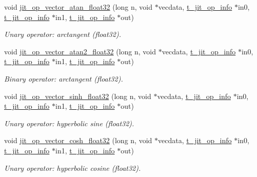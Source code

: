 \begin{DoxyCompactItemize}
void \hyperlink{group__opvecmod_gaeb40d9e60bc56e3cb0b2c8c595320d29}{jit\_\-op\_\-vector\_\-atan\_\-float32} (long n, void $\ast$vecdata, \hyperlink{structt__jit__op__info}{t\_\-jit\_\-op\_\-info} $\ast$in0, \hyperlink{structt__jit__op__info}{t\_\-jit\_\-op\_\-info} $\ast$in1, \hyperlink{structt__jit__op__info}{t\_\-jit\_\-op\_\-info} $\ast$out)
\begin{DoxyCompactList}\small\item\em Unary operator: arctangent (float32). \item\end{DoxyCompactList}\item 
void \hyperlink{group__opvecmod_ga2dfff20e34210f289f81daa3659e9e01}{jit\_\-op\_\-vector\_\-atan2\_\-float32} (long n, void $\ast$vecdata, \hyperlink{structt__jit__op__info}{t\_\-jit\_\-op\_\-info} $\ast$in0, \hyperlink{structt__jit__op__info}{t\_\-jit\_\-op\_\-info} $\ast$in1, \hyperlink{structt__jit__op__info}{t\_\-jit\_\-op\_\-info} $\ast$out)
\begin{DoxyCompactList}\small\item\em Binary operator: arctangent (float32). \item\end{DoxyCompactList}\item 
void \hyperlink{group__opvecmod_gae9e0f85188a1b8e4e6bb9bc717edf3cf}{jit\_\-op\_\-vector\_\-sinh\_\-float32} (long n, void $\ast$vecdata, \hyperlink{structt__jit__op__info}{t\_\-jit\_\-op\_\-info} $\ast$in0, \hyperlink{structt__jit__op__info}{t\_\-jit\_\-op\_\-info} $\ast$in1, \hyperlink{structt__jit__op__info}{t\_\-jit\_\-op\_\-info} $\ast$out)
\begin{DoxyCompactList}\small\item\em Unary operator: hyperbolic sine (float32). \item\end{DoxyCompactList}\item 
void \hyperlink{group__opvecmod_ga26f840eb263eb7892a5bdf4f3ab09af5}{jit\_\-op\_\-vector\_\-cosh\_\-float32} (long n, void $\ast$vecdata, \hyperlink{structt__jit__op__info}{t\_\-jit\_\-op\_\-info} $\ast$in0, \hyperlink{structt__jit__op__info}{t\_\-jit\_\-op\_\-info} $\ast$in1, \hyperlink{structt__jit__op__info}{t\_\-jit\_\-op\_\-info} $\ast$out)
\begin{DoxyCompactList}\small\item\em Unary operator: hyperbolic cosine (float32). \item\end{DoxyCompactList}\item 

\end{DoxyCompactItemize}
